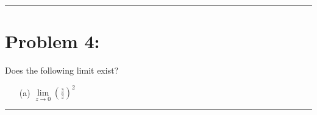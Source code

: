 \documentclass{article}
\begin{document}
\hrule

\newpage
\section*{Problem 4: }
Does the following limit exist?
\begin{enumerate}
  \item[(a)] $\lim\limits_{z \to 0} \left(\frac{\bar{z}}{z}\right)^2$
\end{enumerate}
\hrule
\end{document}
